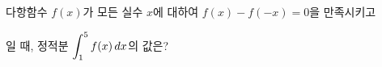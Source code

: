 다항함수 $f(x)$가 모든 실수 $x$에 대하여 $f(x)-f(-x)=0$을 만족시키고\par\smallskip{}\par\smallskip\noindent 일 때, 정적분 $\displaystyle\int_{1}^{5}f(x)\mkern3mu dx$의 값은?
